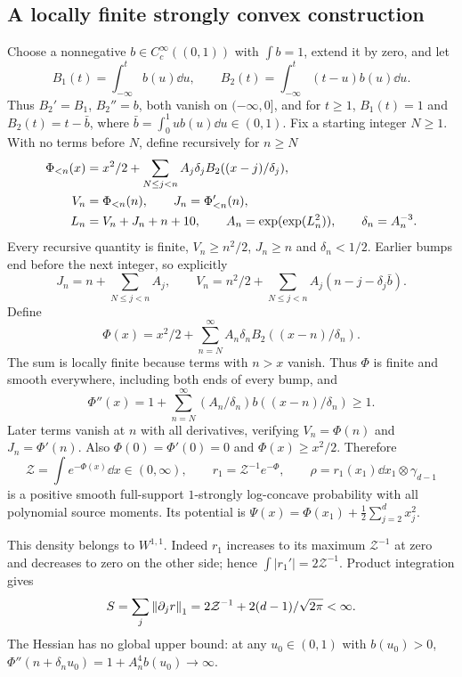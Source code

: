 \documentclass[11pt]{article}
\numberwithin{equation}{section}
\theoremstyle{remark}\newtheorem{remark}[theorem]{Remark}
\begin{document}
\subsection{A locally finite strongly convex construction}
Choose a nonnegative $b\in C_c^\infty((0,1))$ with $\int b=1$, extend it by zero, and let
\[
 B_1(t)=\int_{-\infty}^t b(u)\dd u,
 \qquad B_2(t)=\int_{-\infty}^t(t-u)b(u)\dd u.
\]
Thus $B_2'=B_1$, $B_2''=b$, both vanish on $(-\infty,0]$, and for $t\ge1$,
$B_1(t)=1$ and $B_2(t)=t-\bar b$, where $\bar b=\int_0^1ub(u)\dd u\in(0,1)$.
Fix a starting integer $N\ge1$. With no terms before $N$, define recursively for $n\ge N$
\begin{align}
 \Phi_{<n}(x)&=x^2/2+\sum_{N\le j<n}A_j\delta_jB_2((x-j)/\delta_j),\notag\\
 V_n&=\Phi_{<n}(n),\qquad J_n=\Phi_{<n}'(n),\notag\\
 L_n&=V_n+J_n+n+10,\qquad
 A_n=\exp(\exp(L_n^2)),\qquad\delta_n=A_n^{-3}.\label{eq:steep-recursion}
\end{align}
Every recursive quantity is finite, $V_n\ge n^2/2$, $J_n\ge n$ and $\delta_n<1/2$. Earlier bumps end before the next integer, so explicitly
\[
 J_n=n+\sum_{N\le j<n}A_j,\qquad
 V_n=n^2/2+\sum_{N\le j<n}A_j(n-j-\delta_j\bar b).
\]
Define
\begin{equation}\label{eq:steep-potential}
 \Phi(x)=x^2/2+\sum_{n=N}^\infty A_n\delta_nB_2((x-n)/\delta_n).
\end{equation}
The sum is locally finite because terms with $n>x$ vanish. Thus $\Phi$ is finite and smooth everywhere, including both ends of every bump, and
\[
 \Phi''(x)=1+\sum_{n=N}^\infty(A_n/\delta_n)b((x-n)/\delta_n)\ge1.
\]
Later terms vanish at $n$ with all derivatives, verifying $V_n=\Phi(n)$ and $J_n=\Phi'(n)$. Also $\Phi(0)=\Phi'(0)=0$ and $\Phi(x)\ge x^2/2$. Therefore
\[
 \mathcal Z=\int e^{-\Phi(x)}\dd x\in(0,\infty),\qquad
 r_1=\mathcal Z^{-1}e^{-\Phi},\qquad
 \rho= r_1(x_1)\dd x_1\otimes\gamma_{d-1}
\]
is a positive smooth full-support $1$-strongly log-concave probability with all polynomial source moments. Its potential is $\Psi(x)=\Phi(x_1)+\tfrac12\sum_{j=2}^d x_j^2$.

This density belongs to $W^{1,1}$. Indeed $r_1$ increases to its maximum $\mathcal Z^{-1}$ at zero and decreases to zero on the other side; hence
$\int|r_1'|=2\mathcal Z^{-1}$. Product integration gives
\begin{equation}\label{eq:steep-S}
 S=\sum_j\left\lVert\partial_jr\right\rVert_1
 =2\mathcal Z^{-1}+2(d-1)/\sqrt{2\pi}<\infty.
\end{equation}
The Hessian has no global upper bound: at any $u_0\in(0,1)$ with $b(u_0)>0$,
$\Phi''(n+\delta_nu_0)=1+A_n^4b(u_0)\to\infty$.
\end{document}
